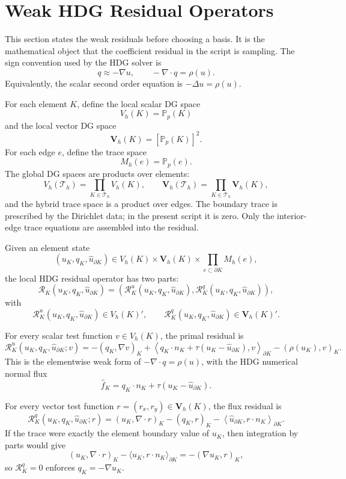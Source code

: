 \documentclass[11pt]{article}
\newcommand{\Th}{\mathcal T_h}
\newcommand{\R}{\mathcal R}
\newcommand{\Vh}{V_h}
\newcommand{\Qh}{\boldsymbol V_h}
\newcommand{\Mh}{M_h}
\begin{document}
\section{Weak HDG Residual Operators}

This section states the weak residuals before choosing a basis.  It is
the mathematical object that the coefficient residual in the script is
sampling.  The sign convention used by the HDG solver is
\[
  q \approx -\nabla u,
  \qquad
  -\nabla\cdot q = \rho(u).
\]
Equivalently, the scalar second order equation is
\(-\Delta u=\rho(u)\).

For each element \(K\), define the local scalar DG space
\[
  \Vh(K) = \mathbb P_p(K)
\]
and the local vector DG space
\[
  \Qh(K) = [\mathbb P_p(K)]^2.
\]
For each edge \(e\), define the trace space
\[
  \Mh(e)=\mathbb P_p(e).
\]
The global DG spaces are products over elements:
\[
  \Vh(\Th)=\prod_{K\in\Th}\Vh(K),
  \qquad
  \Qh(\Th)=\prod_{K\in\Th}\Qh(K),
\]
and the hybrid trace space is a product over edges.  The boundary trace
is prescribed by the Dirichlet data; in the present script it is zero.
Only the interior-edge trace equations are assembled into the residual.

Given an element state
\[
  (u_K,q_K,\widehat u_{\partial K})
  \in
  \Vh(K)\times\Qh(K)\times\prod_{e\subset\partial K}\Mh(e),
\]
the local HDG residual operator has two parts:
\[
  \R_K(u_K,q_K,\widehat u_{\partial K})
  =
  \left(
    \R^u_K(u_K,q_K,\widehat u_{\partial K}),
    \R^q_K(u_K,q_K,\widehat u_{\partial K})
  \right),
\]
with
\[
  \R^u_K(u_K,q_K,\widehat u_{\partial K})\in \Vh(K)',
  \qquad
  \R^q_K(u_K,q_K,\widehat u_{\partial K})\in \Qh(K)'.
\]

For every scalar test function \(v\in\Vh(K)\), the primal residual is
\[
  \boxed{
  \R^u_K(u_K,q_K,\widehat u_{\partial K};v)
  =
  -(q_K,\nabla v)_K
  +
  \left\langle
    q_K\cdot n_K+\tau(u_K-\widehat u_{\partial K}),
    v
  \right\rangle_{\partial K}
  -
  (\rho(u_K),v)_K .
  }
\]
This is the elementwise weak form of
\(-\nabla\cdot q=\rho(u)\), with the HDG numerical normal flux
\[
  \widehat f_K
  =
  q_K\cdot n_K+\tau(u_K-\widehat u_{\partial K}).
\]

For every vector test function \(r=(r_x,r_y)\in\Qh(K)\), the flux
residual is
\[
  \boxed{
  \R^q_K(u_K,q_K,\widehat u_{\partial K};r)
  =
  (u_K,\nabla\cdot r)_K
  -
  (q_K,r)_K
  -
  \left\langle
    \widehat u_{\partial K},r\cdot n_K
  \right\rangle_{\partial K}.
  }
\]
If the trace were exactly the element boundary value of \(u_K\), then
integration by parts would give
\[
  (u_K,\nabla\cdot r)_K
  -
  \langle u_K,r\cdot n_K\rangle_{\partial K}
  =
  -(\nabla u_K,r)_K,
\]
so \(\R^q_K=0\) enforces \(q_K=-\nabla u_K\).
\end{document}
